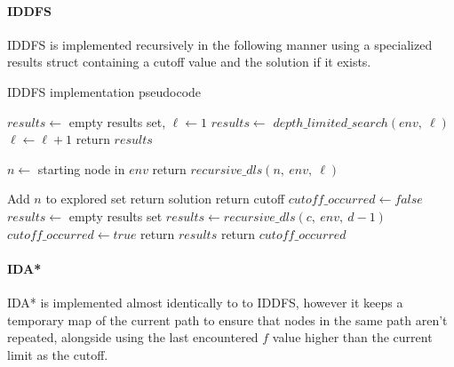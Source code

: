 \paragraph{IDDFS} %
\label{par:iddfs}
IDDFS is implemented recursively in the following manner using a specialized results struct containing a cutoff value and the solution if it exists.

\begin{breakablealgorithm}
\caption{IDDFS implementation pseudocode}
\begin{algorithmic}[1]
		\State $results \gets$ empty results set, $\ell \gets 1$
			\State $results \gets$ $depth\_limited\_search(env,\ \ell)$
			\State $\ell \gets \ell + 1$
		\EndWhile
		\State return $results$
	\EndProcedure

	\State

		\State $n \gets$ starting node in $env$
		\State return $\mathit{recursive\_dls}(n,\ env,\ \ell)$
	\EndProcedure

	\State

		\State Add $n$ to explored set
		 return solution \EndIf
		 return cutoff \EndIf
		\State $\mathit{cutoff\_occurred} \gets false$
		\State $results \gets$ empty results set
				\State $results \gets \mathit{recursive\_dls}(c,\ env,\ d-1)$
					$\mathit{cutoff\_occurred} \gets true$
					return $results$
				\EndIf
			\EndIf
		\EndFor
		\State return $\mathit{cutoff\_occurred}$
	\EndProcedure


\end{algorithmic}
\end{breakablealgorithm}

\paragraph{IDA*} %
\label{par:ida_}
IDA* is implemented almost identically to to IDDFS, however it keeps a temporary map of the current path to ensure that nodes in the same path aren't repeated, alongside using the last encountered $f$ value higher than the current limit as the cutoff.

